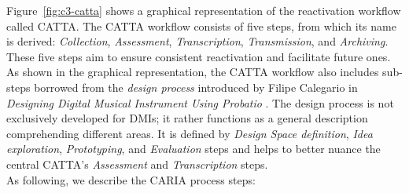 Figure~\ref{fig:c3-catta} shows a graphical representation of the reactivation workflow called CATTA. The CATTA workflow consists of five steps, from which its name is derived: \textit{Collection}, \textit{Assessment}, \textit{Transcription}, \textit{Transmission}, and \textit{Archiving}. These five steps aim to ensure consistent reactivation and facilitate future ones. As shown in the graphical representation, the CATTA workflow also includes sub-steps borrowed from the \textit{design process} introduced by Filipe Calegario in \textit{Designing Digital Musical Instrument Using Probatio} \cite{calegario2018designing}. The design process is not exclusively developed for DMIs; it rather functions as a general description comprehending different areas. It is defined by \textit{Design Space definition}, \textit{Idea exploration}, \textit{Prototyping}, and \textit{Evaluation} steps and helps to better nuance the central CATTA’s \textit{Assessment} and \textit{Transcription} steps.\\
As following, we describe the CARIA process steps:
